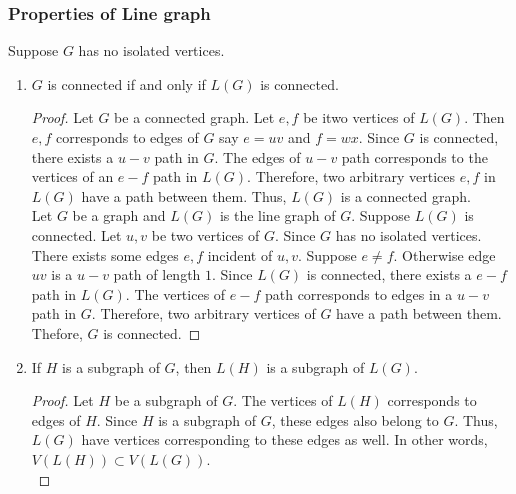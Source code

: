 \subsubsection{Properties of Line graph}
Suppose $G$ has no isolated vertices.
\begin{enumerate}
	\item $G$ is connected if and only if $L(G)$ is connected.
	\begin{proof}
		Let $G$ be a connected graph. Let $e,f$ be itwo vertices of $L(G)$. Then $e,f$ corresponds to edges of $G$ say $e = uv$ and $f = wx$. Since $G$ is connected, there exists a $u-v$ path in $G$. The edges of $u-v$ path corresponds to the vertices of an $e-f$ path in $L(G)$. Therefore, two arbitrary vertices $e,f$ in $L(G)$ have a path between them. Thus, $L(G)$ is a connected graph.\\

		Let $G$ be a graph and $L(G)$ is the line graph of $G$. Suppose $L(G)$ is connected. Let $u,v$ be two vertices of $G$. Since $G$ has no isolated vertices. There exists some edges $e,f$ incident of $u,v$. Suppose $e \ne f$. Otherwise edge $uv$ is a $u-v$ path of length $1$. Since $L(G)$ is connected, there exists a $e-f$ path in $L(G)$. The vertices of $e-f$ path corresponds to edges in a $u-v$ path in $G$. Therefore, two arbitrary vertices of $G$ have a path between them. Thefore, $G$ is connected.
	\end{proof}
	\item If $H$ is a subgraph of $G$, then $L(H)$ is a subgraph of $L(G)$.
	\begin{proof}
		Let $H$ be a subgraph of $G$.
		The vertices of $L(H)$ corresponds to edges of $H$. Since $H$ is a subgraph of $G$, these edges also belong to $G$. Thus, $L(G)$ have vertices corresponding to these edges as well. In other words, $V(L(H)) \subset V(L(G))$.\\


\end{proof}
\end{enumerate}
